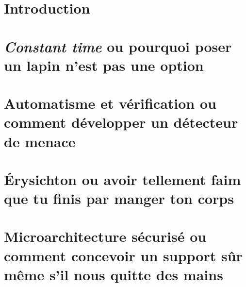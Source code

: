 \documentclass{backend}
\begin{document}
\frontmatter%
\maketitle
\thispagestyle{empty}



\justifying



\cleardoublepage
\tableofcontents

\part{Introduction}




\mainmatter%
\part{\textit{Constant time} ou pourquoi poser un lapin n'est pas une option}




\part{Automatisme et vérification ou comment développer un détecteur de menace}




\part{Érysichton ou avoir tellement faim que tu finis par manger ton corps}




\part{Microarchitecture sécurisé ou comment concevoir un support sûr même s'il nous quitte des mains}
\end{document}
